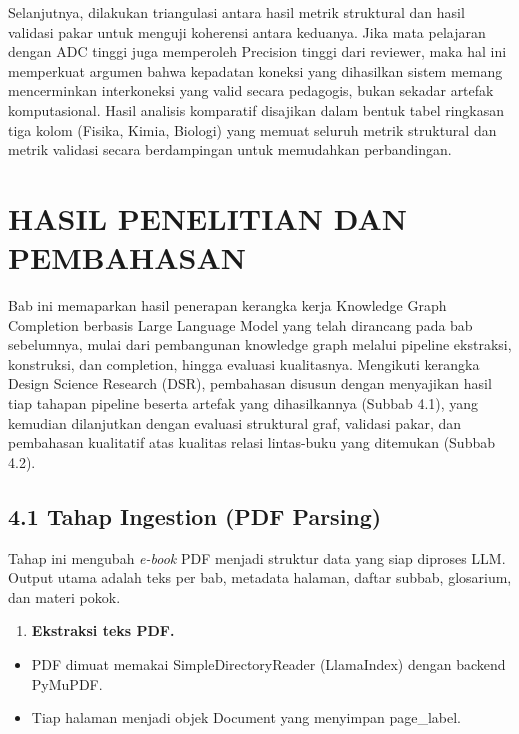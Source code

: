 \documentclass[
]{article}
\begin{document}
Selanjutnya, dilakukan triangulasi antara hasil metrik struktural dan
hasil validasi pakar untuk menguji koherensi antara keduanya. Jika mata
pelajaran dengan ADC tinggi juga memperoleh Precision tinggi dari
reviewer, maka hal ini memperkuat argumen bahwa kepadatan koneksi yang
dihasilkan sistem memang mencerminkan interkoneksi yang valid secara
pedagogis, bukan sekadar artefak komputasional. Hasil analisis
komparatif disajikan dalam bentuk tabel ringkasan tiga kolom (Fisika,
Kimia, Biologi) yang memuat seluruh metrik struktural dan metrik
validasi secara berdampingan untuk memudahkan perbandingan.

\hypertarget{hasil-penelitian-dan-pembahasan}{%
\section{\texorpdfstring{\hfill\break
HASIL PENELITIAN DAN
PEMBAHASAN}{ HASIL PENELITIAN DAN PEMBAHASAN}}\label{hasil-penelitian-dan-pembahasan}}

Bab ini memaparkan hasil penerapan kerangka kerja Knowledge Graph
Completion berbasis Large Language Model yang telah dirancang pada bab
sebelumnya, mulai dari pembangunan knowledge graph melalui pipeline
ekstraksi, konstruksi, dan completion, hingga evaluasi kualitasnya.
Mengikuti kerangka Design Science Research (DSR), pembahasan disusun
dengan menyajikan hasil tiap tahapan pipeline beserta artefak yang
dihasilkannya (Subbab 4.1), yang kemudian dilanjutkan dengan evaluasi
struktural graf, validasi pakar, dan pembahasan kualitatif atas kualitas
relasi lintas-buku yang ditemukan (Subbab 4.2).

\hypertarget{tahap-ingestion-pdf-parsing}{%
\subsection{4.1 Tahap Ingestion (PDF
Parsing)}\label{tahap-ingestion-pdf-parsing}}

Tahap ini mengubah \emph{e-book} PDF menjadi struktur data yang siap
diproses LLM. Output utama adalah teks per bab, metadata halaman, daftar
subbab, glosarium, dan materi pokok.

\begin{enumerate}
\def\labelenumi{\arabic{enumi}.}
\item
  \textbf{Ekstraksi teks PDF.}
\end{enumerate}

\begin{itemize}
\item
  PDF dimuat memakai SimpleDirectoryReader (LlamaIndex) dengan backend
  PyMuPDF.
\item
  Tiap halaman menjadi objek Document yang menyimpan page\_label.
\end{itemize}
\end{document}
